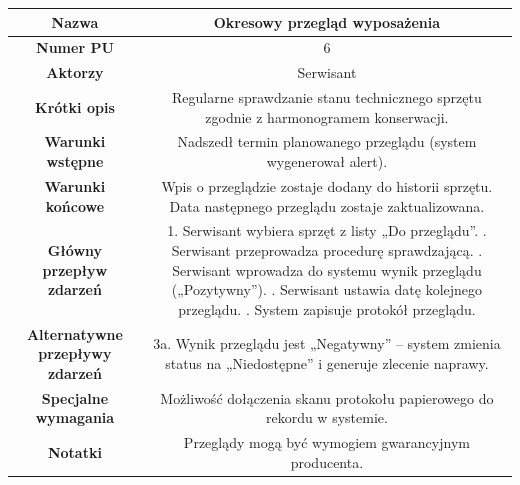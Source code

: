 \documentclass{article}
\begin{document}
    \begin{tabular}{|c|c|}%
        \hline
        \textbf{Nazwa} & Okresowy przegląd wyposażenia \\
        \hline
        \textbf{Numer PU} & 6 \\
        \hline
        \textbf{Aktorzy} & Serwisant \\
        \hline
        \textbf{Krótki opis} & Regularne sprawdzanie stanu technicznego sprzętu zgodnie z harmonogramem konserwacji. \\
        \hline
        \textbf{Warunki wstępne} & Nadszedł termin planowanego przeglądu (system wygenerował alert). \\
        \hline
        \textbf{Warunki końcowe} & Wpis o przeglądzie zostaje dodany do historii sprzętu. Data następnego przeglądu zostaje zaktualizowana. \\
        \hline
        \textbf{Główny przepływ zdarzeń} & 
            1. Serwisant wybiera sprzęt z listy „Do przeglądu”. \newline
            2. Serwisant przeprowadza procedurę sprawdzającą. \newline
            3. Serwisant wprowadza do systemu wynik przeglądu („Pozytywny”). \newline
            4. Serwisant ustawia datę kolejnego przeglądu. \newline
            5. System zapisuje protokół przeglądu. \\
        \hline
        \textbf{Alternatywne przepływy zdarzeń} & 
            3a. Wynik przeglądu jest „Negatywny” – system zmienia status na „Niedostępne” i generuje zlecenie naprawy. \\
        \hline
        \textbf{Specjalne wymagania} & Możliwość dołączenia skanu protokołu papierowego do rekordu w systemie. \\
        \hline
        \textbf{Notatki} & Przeglądy mogą być wymogiem gwarancyjnym producenta. \\
        \hline
    \end{tabular}

    \vspace{1cm}
\end{document}
